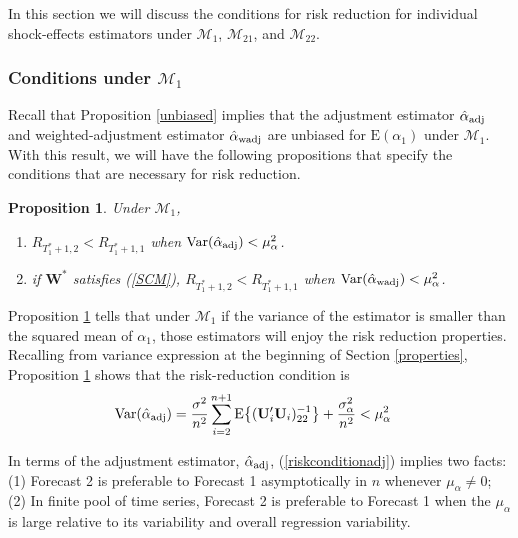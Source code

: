 \documentclass[11pt]{article}
\def\mbf#1{\mathbf{#1}} %
\def\mrm#1{\mathrm{#1}} %
\def\mc#1{\mathcal{#1}} %
\def\E#1{\mathrm{E}(#1)} %
\def\var#1{\mathrm{Var}(#1)} %
\DeclareMathOperator{\Var}{Var} %
\newtheorem{prop}{Proposition}
\theoremstyle{definition}
\begin{document}
In this section we will discuss the conditions for risk reduction for individual shock-effects estimators under $\mc{M}_1$, $\mc{M}_{21}$, and $\mc{M}_{22}$. %

\subsubsection{Conditions under $\mc{M}_1$}
 \label{conditionsmodel1}
 
Recall that Proposition \ref{unbiased} implies that the adjustment estimator $\hat{\alpha}_{\rm adj}$ and weighted-adjustment estimator $\hat{\alpha}_{\rm wadj}$ are unbiased for $\E{\alpha_1}$ under $\mc{M}_1$. With this result, we will have  the following propositions that specify the conditions that are necessary for risk reduction. 

\begin{prop}
\label{proprisk}Under $\mc{M}_1$,
\begin{enumerate}[label = (\roman*)]
  \item  $R_{T_1^*+1, 2} < R_{T_1^*+1, 1}$ when 
$\Var(\hat{\alpha}_{\rm adj}) < \mu_{\alpha}^2$.
  \item if $\mbf{W}^*$ satisfies (\ref{SCM}), $R_{T_1^*+1,2}<R_{T_1^*+1,1}$ when $\var{\hat{\alpha}_{\rm wadj}}<\mu_{\alpha}^2$. 
\end{enumerate}
\end{prop}

Proposition \ref{proprisk} tells that under $\mc{M}_1$ if the variance of the estimator is smaller than the squared mean of $\alpha_1$, those estimators will enjoy the risk reduction properties. Recalling from variance expression at the beginning of Section \ref{properties}, Proposition \ref{proprisk} shows that the risk-reduction condition is
\begin{align}
  \var{\hat{\alpha}_{\rm adj}} 
  &=\frac{\sigma^2}{n^2}\sum_{i=2}^{n+1}\mrm{E}\big\{(\mbf{U}'_i\mbf{U}_i)^{-1}_{22}\big\}+\frac{\sigma^2_{\alpha}}{n^2} < \mu_{\alpha}^2 \label{riskconditionadj}
\end{align}

In terms of the adjustment estimator, $\hat{\alpha}_{\rm adj}$, (\ref{riskconditionadj}) implies two facts: (1) Forecast 2 is preferable to Forecast 1 asymptotically in $n$ 
whenever $\mu_{\alpha} \neq 0$; (2) In finite pool of time series, Forecast 2 is preferable to 
Forecast 1 when the $\mu_{\alpha}$ is large relative to its variability and 
overall regression variability.   %
\end{document}
